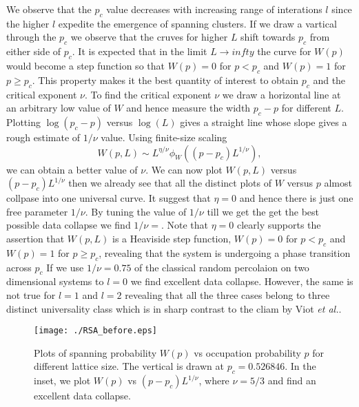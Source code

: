 ﻿\documentclass[twocolumn,showpacs,preprintnumbers,amsmath,amssymb]{revtex4}
\begin{document}
We observe that the $p_c$ value decreases with increasing range of interations $l$ since the 
higher $l$ expedite the emergence of spanning clusters. If we draw a vartical through the $p_c$ we observe 
that the cruves for higher $L$ shift towards $p_c$ from either side of $p_c$. It is expected
 that in the limit $L\rightarrow infty$ the curve
for $W(p)$ would become a step function so that $W(p)=0$ for $p<p_c$ and $W(p)=1$ for $p\geq p_c$. This property makes
it the best quantity of interest to obtain $p_c$ and the critical exponent $\nu$. To find the critical
exponent $\nu$ we draw a horizontal line at an arbitrary low value of $W$ and hence
measure the width $p_c-p$ for different $L$. Plotting $\log(p_c-p)$ versus $\log(L)$ gives a straight line
whose slope gives a rough estimate of $1/\nu$ value. Using finite-size scaling
\begin{equation}
W(p,L)\sim L^{\eta/\nu}\phi_W((p-p_c)L^{1/\nu}),
\end{equation}
we can obtain a better value of $\nu$. We can now plot $W(p,L)$ versus $(p-p_c)L^{1/\nu}$ then we already see that all the distinct plots of $W$ versus $p$
almost collpase into one universal curve. It suggest that $\eta=0$ and hence there is just one free parameter $1/\nu$. By tuning the value of $1/\nu$ till we get the
get the best possible data collapse we find $1/\nu=$. Note that $\eta=0$ clearly supports 
the assertion that $W(p,L)$ is a Heaviside step function, $W(p)=0$ for $p<p_c$ and $W(p)=1$ for $p\geq p_c$, revealing that the system is undergoing a phase transition across $p_c$  
If we use $1/\nu=0.75$ of the classical random percolaion on two dimensional systems to $l=0$ we find excellent data collapse. However, the same is not true for $l=1$ and $l=2$ revealing that
all the three cases belong to three distinct universality class which is in sharp contrast to the cliam by Viot {\it et al.}.


\begin{figure}
\label{fig2}
\texttt{[image: ./RSA\_before.eps]}
\caption{Plots of spanning probability $W(p)$ vs  occupation probability $p$ for different lattice size. The vertical is drawn at $p_c=0.526846$. In the inset, 
we plot  $W(p)$ vs $(p-p_c)L^{1/\nu}$, where $\nu=5/3$ and find an excellent data collapse.
\label{fig2}
}
\end{figure}
\end{document}

